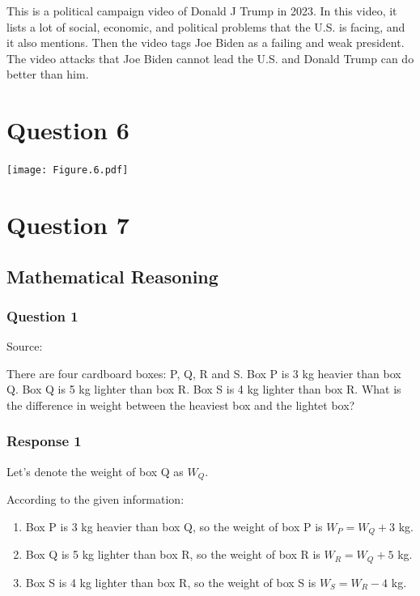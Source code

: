 \documentclass[12pt, a4paper]{article}
\begin{document}
This is a political campaign video of Donald J Trump in 2023. In this video, it lists a lot of social, economic, and political problems that the U.S. is facing, and it also mentions. Then the video tags Joe Biden as a failing and weak president. The video attacks that Joe Biden cannot lead the U.S. and Donald Trump can do better than him.

\newpage
\section*{Question 6}
\texttt{[image: Figure.6.pdf]}

\newpage
\section*{Question 7}
\subsection*{Mathematical Reasoning}
\subsubsection*{Question 1}
Source: \cite{NSW_Government_2022}

There are four cardboard boxes: P, Q, R and S. Box P is 3 kg heavier than box Q. Box Q is 5 kg lighter than box R. Box S is 4 kg lighter than box R. What is the difference in weight between the heaviest box and the lightet box?

\subsubsection*{Response 1}
Let's denote the weight of box Q as $W_Q$.

According to the given information:
\begin{enumerate}
    \item Box P is 3 kg heavier than box Q, so the weight of box P is $W_P=W_Q+3$ kg.
    \item Box Q is 5 kg lighter than box R, so the weight of box R is $W_R=W_Q+5$ kg.
    \item Box S is 4 kg lighter than box R, so the weight of box S is $W_S=W_R-4$ kg.
\end{enumerate}
\end{document}
